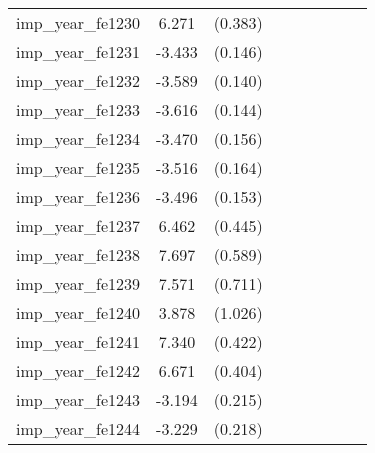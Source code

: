 {\begin{tabular}{l*{4}{cc}}
imp\_year\_fe1230&    6.271\sym{***}&  (0.383)&                  &         &                  &         &                  &         \\
imp\_year\_fe1231&   -3.433\sym{***}&  (0.146)&                  &         &                  &         &                  &         \\
imp\_year\_fe1232&   -3.589\sym{***}&  (0.140)&                  &         &                  &         &                  &         \\
imp\_year\_fe1233&   -3.616\sym{***}&  (0.144)&                  &         &                  &         &                  &         \\
imp\_year\_fe1234&   -3.470\sym{***}&  (0.156)&                  &         &                  &         &                  &         \\
imp\_year\_fe1235&   -3.516\sym{***}&  (0.164)&                  &         &                  &         &                  &         \\
imp\_year\_fe1236&   -3.496\sym{***}&  (0.153)&                  &         &                  &         &                  &         \\
imp\_year\_fe1237&    6.462\sym{***}&  (0.445)&                  &         &                  &         &                  &         \\
imp\_year\_fe1238&    7.697\sym{***}&  (0.589)&                  &         &                  &         &                  &         \\
imp\_year\_fe1239&    7.571\sym{***}&  (0.711)&                  &         &                  &         &                  &         \\
imp\_year\_fe1240&    3.878\sym{***}&  (1.026)&                  &         &                  &         &                  &         \\
imp\_year\_fe1241&    7.340\sym{***}&  (0.422)&                  &         &                  &         &                  &         \\
imp\_year\_fe1242&    6.671\sym{***}&  (0.404)&                  &         &                  &         &                  &         \\
imp\_year\_fe1243&   -3.194\sym{***}&  (0.215)&                  &         &                  &         &                  &         \\
imp\_year\_fe1244&   -3.229\sym{***}&  (0.218)&                  &         &                  &         &                  &         \\

\end{tabular}}
